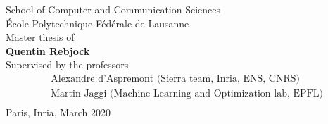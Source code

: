 \begin{titlepage}
\begin{center}
School of Computer and Communication Sciences\\
École Polytechnique Fédérale de Lausanne\\
\vspace{1cm}
Master thesis of\\[3pt]
\textbf{Quentin Rebjock}\\
\vspace{1.2cm}
\small
Supervised by the professors%
\begin{align*}
	&\text{Alexandre d'Aspremont (Sierra team, Inria, ENS, CNRS)}\\
	&\text{Martin Jaggi (Machine Learning and Optimization lab, EPFL)}\\[24pt]
\end{align*}
Paris, Inria, March 2020

\end{center}
\end{titlepage}

\restoregeometry
